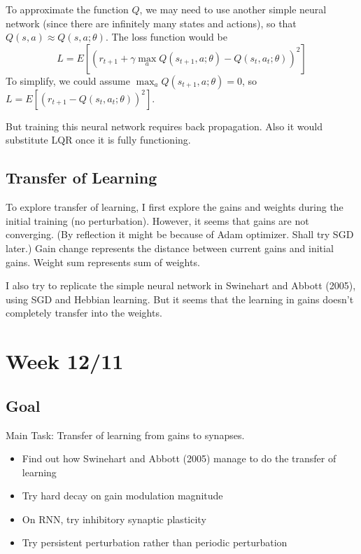 \documentclass[12pt, a4paper]{article}
\begin{document}
To approximate the function $Q$, we may need to use another simple neural network (since there are infinitely many states and actions), so that $Q(s,a) \approx Q(s,a;\theta)$. The loss function would be 
$$ L = E \left[ \left( r_{t+1} + \gamma \max_{a} Q(s_{t+1},a; \theta) - Q(s_t, a_t; \theta) \right)^2 \right] $$
To simplify, we could assume $\max_{a} Q(s_{t+1}, a; \theta) = 0$, so $ L = E \left[ \left( r_{t+1} - Q(s_t, a_t; \theta) \right)^2 \right] $. 

But training this neural network requires back propagation. Also it would substitute LQR once it is fully functioning.

\newpage

\subsection*{Transfer of Learning}

To explore transfer of learning, I first explore the gains and weights during the initial training (no perturbation). However, it seems that gains are not converging. (By reflection it might be because of Adam optimizer. Shall try SGD later.) Gain change represents the distance between current gains and initial gains. Weight sum represents sum of weights.

I also try to replicate the simple neural network in Swinehart and Abbott (2005), using SGD and Hebbian learning. But it seems that the learning in gains doesn't completely transfer into the weights.

\newpage


\section*{Week 12/11}

\subsection*{Goal}

\noindent
Main Task: Transfer of learning from gains to synapses.

\begin{itemize}
    \item Find out how Swinehart and Abbott (2005) manage to do the transfer of learning
    \item Try hard decay on gain modulation magnitude
    \item On RNN, try inhibitory synaptic plasticity
    \item Try persistent perturbation rather than periodic perturbation
\end{itemize}
\end{document}
